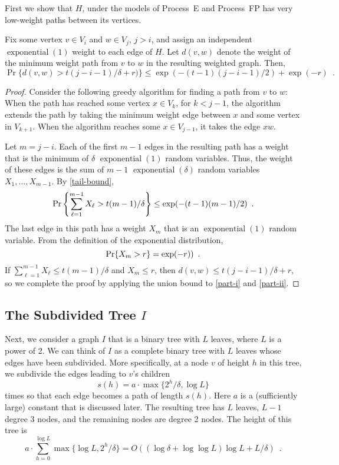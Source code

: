 \documentclass{patmorin}
\DeclareMathOperator{\exponential}{exponential}
\begin{document}
First we show that $H$, under the models of Process~E and Process~FP
has very low-weight paths between its vertices.

\begin{lem}
   Fix some vertex $v\in V_i$ and $w\in V_j$, $j>i$, and assign an
   independent $\exponential(1)$ weight to each edge of $H$.  Let $d(v,w)$
   denote the weight of the minimum weight path from $v$ to $w$ in the
   resulting weighted graph.  Then,
   \[
       \Pr\{d(v,w) > t(j-i-1)/\delta + r) \} \le
         \exp(-(t-1)(j-i-1)/2) + \exp(-r) \enspace .
   \]
\end{lem}

\begin{proof}
   Consider the following greedy algorithm for finding a path from $v$
   to $w$: When the path has reached some vertex $x\in V_{k}$, for
   $k<j-1$, the algorithm extends the path by taking the minimum weight
   edge between $x$ and some vertex in $V_{k+1}$.  When the algorithm
   reaches some $x\in V_{j-1}$, it takes the edge $xw$.

   Let $m=j-i$.
   Each of the first $m-1$ edges in the resulting path has a
   weight that is the minimum of $\delta$ $\exponential(1)$ random
   variables.  Thus, the weight of these edges is the sum of $m-1$
   $\exponential(\delta)$ random variables $X_1,\ldots,X_{m-1}$.  
   By \eqref{tail-bound}, 
   \begin{equation}
     \Pr\left\{\sum_{\ell=1}^{m-1} X_\ell > t(m-1)/\delta \right\} \le 
        \exp(-(t-1)(m-1)/2) \enspace .  \eqlabel{part-i}
   \end{equation}
   The last edge in this path has a weight $X_m$ that is an
   $\exponential(1)$ random variable.  From the definition
   of the exponential distribution,
   \begin{equation}
      \Pr\{X_m > r\} = \exp(-r)) \enspace . \eqlabel{part-ii}
   \end{equation}
   If $\sum_{\ell=1}^{m-1} X_\ell \le t(m-1)/\delta$ and $X_m \le r$, then
   $d(v,w)\le t(j-i-1)/\delta + r$, so we complete the proof by 
   applying the union bound to \eqref{part-i} and \eqref{part-ii}.
\end{proof}

\subsection{The Subdivided Tree $I$}

Next, we consider a graph $I$ that is a binary tree with $L$ leaves,
where $L$ is a power of 2.  We can think of $I$ as a complete binary tree
with $L$ leaves whose edges have been subdivided.  More specifically,
at a node $v$ of height $h$ in this tree, we subdivide the edges leading
to $v$'s children
\[
   s(h) = a\cdot\max\{2^h/\delta,\log L\} 
\]
times so that each edge becomes a path of length $s(h)$.  Here $a$ is a
(sufficiently large) constant that is discussed later.  The resulting
tree has $L$ leaves, $L-1$ degree 3 nodes, and the remaining nodes are
degree 2 nodes.  The height of this tree is
\[
   a\cdot\sum_{h=0}^{\log L} \max\{\log L, 2^h/\delta\}
     = O( (\log\delta+\log\log L)\log L + L/\delta ) \enspace .
\]
\end{document}
